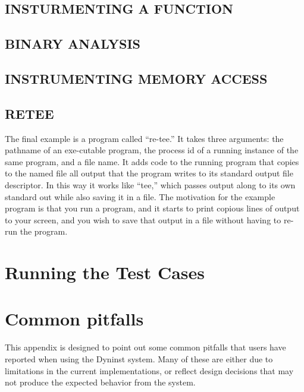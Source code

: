 \documentclass[twopages,a4paper]{article}
\begin{document}
\subsection{INSTURMENTING A FUNCTION}



\subsection{BINARY ANALYSIS}



\subsection{INSTRUMENTING MEMORY ACCESS}



\subsection{RETEE}

The final example is a program called “re-tee.”  It takes three arguments: the pathname of an exe-cutable program, the process id of a running instance of the same program, and a file name.  It adds code to the running program that copies to the named file all output that the program writes to its standard output file descriptor.  In this way it works like “tee,” which passes output along to its own standard out while also saving it in a file.  The motivation for the example program is that you run a program, and it starts to print copious lines of output to your screen, and you wish to save that output in a file without having to re-run the program. 




\pagebreak
\section{Running the Test Cases}

\pagebreak
\section{Common pitfalls}

This appendix is designed to point out some common pitfalls that users have reported when using the Dyninst system.  Many of these are either due to limitations in the current implementations, or reflect design decisions that may not produce the expected behavior from the system.\\
\end{document}
